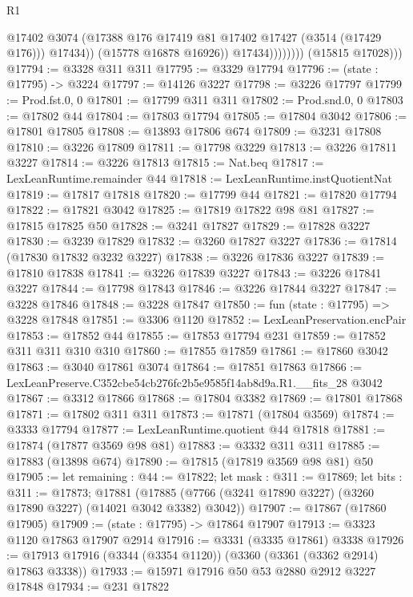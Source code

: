 \begin{lexlean}{R1}
\begin{coremodule}
                              @17402
                              @3074
                              (@17388 @176 @17419 @81 @17402 @17427 (@3514 (@17429 @176)))
                              @17434))
                          (@15778 @16878 @16926))
                        @17434))))))))
        (@15815 @17028)))
@17794 := @3328 @311 @311
@17795 := @3329 @17794
@17796 := (state : @17795) -> @3224
@17797 := @14126 @3227
@17798 := @3226 @17797
@17799 := Prod.fst.{0, 0}
@17801 := @17799 @311 @311
@17802 := Prod.snd.{0, 0}
@17803 := @17802 @44
@17804 := @17803 @17794
@17805 := @17804 @3042
@17806 := @17801 @17805
@17808 := @13893 @17806 @674
@17809 := @3231 @17808
@17810 := @3226 @17809
@17811 := @17798 @3229
@17813 := @3226 @17811 @3227
@17814 := @3226 @17813
@17815 := Nat.beq
@17817 := LexLeanRuntime.remainder @44
@17818 := LexLeanRuntime.instQuotientNat
@17819 := @17817 @17818
@17820 := @17799 @44
@17821 := @17820 @17794
@17822 := @17821 @3042
@17825 := @17819 @17822 @98 @81
@17827 := @17815 @17825 @50
@17828 := @3241 @17827
@17829 := @17828 @3227
@17830 := @3239 @17829
@17832 := @3260 @17827 @3227
@17836 := @17814 (@17830 @17832 @3232 @3227)
@17838 := @3226 @17836 @3227
@17839 := @17810 @17838
@17841 := @3226 @17839 @3227
@17843 := @3226 @17841 @3227
@17844 := @17798 @17843
@17846 := @3226 @17844 @3227
@17847 := @3228 @17846
@17848 := @3228 @17847
@17850 := fun (state : @17795) => @3228 @17848
@17851 := @3306 @1120
@17852 := LexLeanPreservation.encPair
@17853 := @17852 @44
@17855 := @17853 @17794 @231
@17859 := @17852 @311 @311 @310 @310
@17860 := @17855 @17859
@17861 := @17860 @3042
@17863 := @3040 @17861 @3074
@17864 := @17851 @17863
@17866 := LexLeanPreserve.C352cbe54cb276fc2b5e9585f14ab8d9a.R1.__fits_28 @3042
@17867 := @3312 @17866
@17868 := @17804 @3382
@17869 := @17801 @17868
@17871 := @17802 @311 @311
@17873 := @17871 (@17804 @3569)
@17874 := @3333 @17794
@17877 := LexLeanRuntime.quotient @44 @17818
@17881 := @17874 (@17877 @3569 @98 @81)
@17883 := @3332 @311 @311
@17885 := @17883 (@13898 @674)
@17890 := @17815 (@17819 @3569 @98 @81) @50
@17905 := let remaining : @44 := @17822;
  let mask : @311 := @17869;
  let bits : @311 := @17873;
  @17881 (@17885 (@7766 (@3241 @17890 @3227) (@3260 @17890 @3227) (@14021 @3042 @3382) @3042))
@17907 := @17867 (@17860 @17905)
@17909 := (state : @17795) -> @17864 @17907
@17913 := @3323 @1120 @17863 @17907 @2914
@17916 := @3331 (@3335 @17861) @3338
@17926 := @17913 @17916 (@3344 (@3354 @1120)) (@3360 (@3361 (@3362 @2914) @17863 @3338))
@17933 := @15971 @17916 @50 @53 @2880 @2912 @3227 @17848
@17934 := @231 @17822

\end{coremodule}
\end{lexlean}
